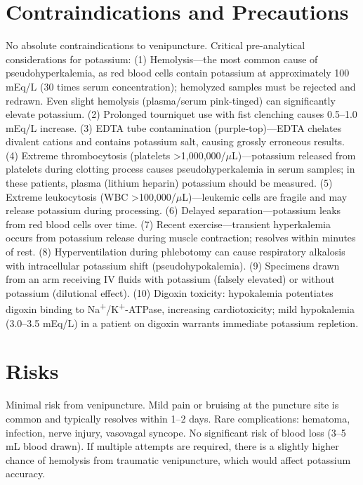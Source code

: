 \section*{Contraindications and Precautions}
No absolute contraindications to venipuncture. Critical pre-analytical considerations for potassium: (1) Hemolysis---the most common cause of pseudohyperkalemia, as red blood cells contain potassium at approximately 100 mEq/L (30 times serum concentration); hemolyzed samples must be rejected and redrawn. Even slight hemolysis (plasma/serum pink-tinged) can significantly elevate potassium. (2) Prolonged tourniquet use with fist clenching causes 0.5--1.0 mEq/L increase. (3) EDTA tube contamination (purple-top)---EDTA chelates divalent cations and contains potassium salt, causing grossly erroneous results. (4) Extreme thrombocytosis (platelets >1,000,000/$\mu$L)---potassium released from platelets during clotting process causes pseudohyperkalemia in serum samples; in these patients, plasma (lithium heparin) potassium should be measured. (5) Extreme leukocytosis (WBC >100,000/$\mu$L)---leukemic cells are fragile and may release potassium during processing. (6) Delayed separation---potassium leaks from red blood cells over time. (7) Recent exercise---transient hyperkalemia occurs from potassium release during muscle contraction; resolves within minutes of rest. (8) Hyperventilation during phlebotomy can cause respiratory alkalosis with intracellular potassium shift (pseudohypokalemia). (9) Specimens drawn from an arm receiving IV fluids with potassium (falsely elevated) or without potassium (dilutional effect). (10) Digoxin toxicity: hypokalemia potentiates digoxin binding to Na\textsuperscript{+}/K\textsuperscript{+}-ATPase, increasing cardiotoxicity; mild hypokalemia (3.0--3.5 mEq/L) in a patient on digoxin warrants immediate potassium repletion.

\section*{Risks}
Minimal risk from venipuncture. Mild pain or bruising at the puncture site is common and typically resolves within 1--2 days. Rare complications: hematoma, infection, nerve injury, vasovagal syncope. No significant risk of blood loss (3--5 mL blood drawn). If multiple attempts are required, there is a slightly higher chance of hemolysis from traumatic venipuncture, which would affect potassium accuracy.

